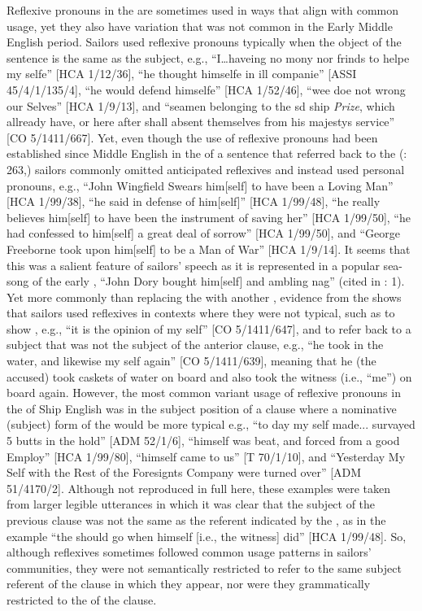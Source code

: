 Reflexive pronouns in the  are sometimes used in ways that align with common usage, yet they also have variation that was not common in the Early Middle English period. Sailors used reflexive pronouns typically when the object of the sentence is the same as the subject, e.g., “I…haveing no mony nor frinds to helpe my selfe” [HCA 1/12/36], “he thought himselfe in ill companie” [ASSI 45/4/1/135/4], “he would defend himselfe” [HCA 1/52/46], “wee doe not wrong our Selves” [HCA 1/9/13], and “seamen belonging to the sd ship \textit{ Prize}, which allready have, or here after shall absent themselves from his majestys service” [CO 5/1411/667]. Yet, even though the use of reflexive pronouns had been established since Middle English in the  of a sentence that referred back to the  (\citealt{MillwardHayes2012}: 263,) sailors commonly omitted anticipated reflexives and instead used  personal pronouns, e.g., “John Wingfield Swears him[self] to have been a Loving Man” [HCA 1/99/38], “he said in defense of him[self]” [HCA 1/99/48], “he really believes him[self] to have been the instrument of saving her” [HCA 1/99/50], “he had confessed to him[self] a great deal of sorrow” [HCA 1/99/50], and “George Freeborne took upon him[self] to be a Man of War” [HCA 1/9/14]. It seems that this was a salient feature of sailors’ speech as it is represented in a popular sea-song of the early , “John Dory bought him[self] and ambling nag” (cited in \citealt{Palmer1986}: 1). Yet more commonly than replacing the  with another , evidence from the  shows that sailors used reflexives in contexts where they were not typical, such as to show , e.g., “it is the opinion of my self” [CO 5/1411/647], and to refer back to a subject that was not the subject of the anterior clause, e.g., “he took in the water, and likewise my self again” [CO 5/1411/639], meaning that he (the accused) took caskets of water on board and also took the witness (i.e., “me”) on board again. However, the most common variant usage of reflexive pronouns in the  of Ship English was in the subject position of a clause where a nominative (subject) form of the  would be more typical e.g., “to day my self made... survayed 5 butts in the hold” [ADM 52/1/6], “himself was beat, and forced from a good Employ” [HCA 1/99/80], “himself came to us” [T 70/1/10], and “Yesterday My Self with the Rest of the Foresignts Company were turned over” [ADM 51/4170/2]. Although not reproduced in full here, these examples were taken from larger legible utterances in which it was clear that the subject of the previous clause was not the same as the referent indicated by the , as in the example “the  should go when himself [i.e., the witness] did” [HCA 1/99/48]. So, although reflexives sometimes followed common usage patterns in sailors’ communities, they were not semantically restricted to refer to the same subject referent of the clause in which they appear, nor were they grammatically restricted to the  of the clause. 

